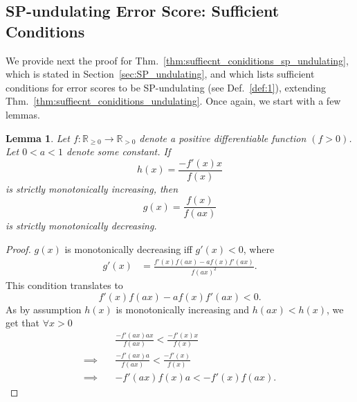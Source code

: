 \documentclass{article}
\newcommand{\R}{\mathbb{R}}
\newcommand{\ahard}{a}
\newcommand{\psn}{\R_{\ge 0}}
\newcommand{\prn}{\R_{> 0}}
\newtheorem{lemma}{Lemma}
\begin{document}
\subsection{SP-undulating Error Score: Sufficient Conditions}
\label{app:proof_thm_3}

We provide next the proof for Thm.~\ref{thm:suffiecnt_coniditions_sp_undulating}, which is stated in Section~\ref{sec:SP_undulating}, and which lists sufficient conditions for error scores to be SP-undulating (see Def.~\ref{def:1}), extending Thm.~\ref{thm:suffiecnt_coniditions_undulating}. Once again, we start with a few lemmas.

\begin{lemma}
\label{thm:1_crossing_point}
Let $f:\psn\rightarrow\prn$ denote a positive differentiable function $(f>0)$. Let $0 < \ahard < 1$ denote some constant. If
\begin{equation*}
h\left(x\right)=\frac{-f'\left(x\right)x}{f\left(x\right)}
\end{equation*}
is strictly monotonically increasing, then
\begin{equation*}
g\left(x\right)=\frac{f\left(x\right)}{f\left(\ahard x\right)}
\end{equation*}
is strictly monotonically decreasing.
\end{lemma}

\begin{proof}

$g\left(x\right)$ is monotonically decreasing iff $g'\left(x\right)<0$, where
\begin{align*}
g'\left(x\right) & =\frac{f'\left(x\right)f\left(\ahard x\right)-\ahard f\left(x\right)f'\left(\ahard x\right)}{f\left(\ahard x\right)^{2}}.
\end{align*}
This condition translates to
\begin{equation*}
f'\left(x\right)f\left(\ahard x\right)-\ahard f\left(x\right)f'\left(\ahard x\right)<0.
\end{equation*}
As by assumption $h\left(x\right)$ is monotonically increasing and $h\left(\ahard x\right)  < h\left(x\right)$, we get that $\forall x>0$
\begin{align*}
\quad &\frac{-f'\left(\ahard x\right)\ahard x}{f\left(\ahard x\right)}  <\frac{-f'\left(x\right)x}{f\left(x\right)} \\
\implies \quad &\frac{-f'\left(\ahard x\right)\ahard}{f\left(\ahard x\right)}  <\frac{-f'\left(x\right)}{f\left(x\right)} \\
\implies \quad &-f'\left(\ahard x\right)f\left(x\right)\ahard  <-f'\left(x\right)f\left(\ahard x\right).\end{align*}
\end{proof}
\end{document}
